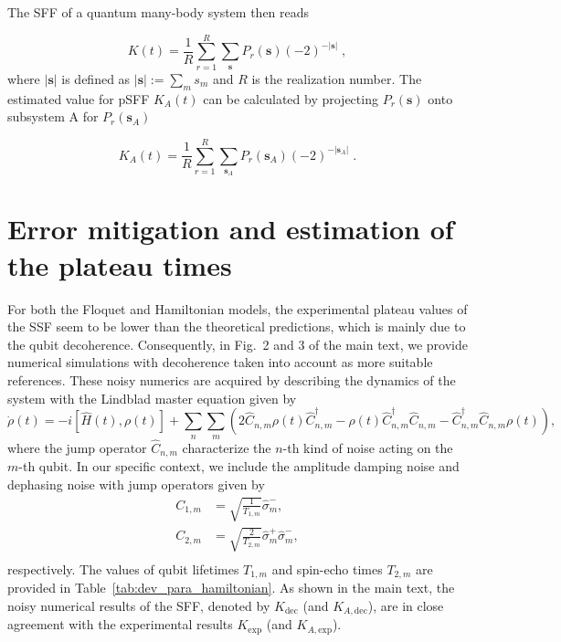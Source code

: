 \documentclass[aps,prx,reprint,twocolumn,superscriptaddress,floatfix,nofootinbib]{revtex4-2}
\begin{document}
The SFF of a quantum many-body system then reads~\cite{ZollerSFF2021}

\begin{equation}

K\left(t\right)
= \frac{1}{R}
\sum_{r=1}^R
\sum_{\mathbf{s}}
P_{r}\left(\mathbf{s}\right)\left(-2\right)^{- |\mathbf{s}|} \; ,
\end{equation}
where $\left|\mathbf{s}\right|$ is defined as $\left|\mathbf{s}\right| := \sum_{m} s_{m}$ and $R$ is the realization number.
The estimated value for pSFF $K_A(t)$ can be calculated by projecting $P_{r}\left(\mathbf{s}\right)$ onto subsystem A for $P_{r}\left(\mathbf{s}_A\right)$

\begin{equation}

K_A\left(t\right)
= \frac{1}{R}
\sum_{r=1}^R
\sum_{\mathbf{s}_A}
P_{r}\left(\mathbf{s}_A\right)\left(-2\right)^{- |\mathbf{s}_A|} \; .
\end{equation}

\section{Error mitigation and estimation of the plateau times}

For both the Floquet and Hamiltonian models, the experimental plateau values of the SSF seem to be lower than the theoretical predictions, which is mainly due to the qubit decoherence. Consequently, in Fig.~2 and 3 of the main text, we provide numerical simulations with decoherence taken into account as more suitable references. These noisy numerics are acquired by describing the dynamics of the system with the Lindblad master equation given by
\begin{equation}
    \dot{\rho}\left(t\right) = -i \left[\hat{H}\left(t\right), \rho\left(t\right)\right]
    + \sum_{n} \sum_{m} \left(2 \hat{C}_{n, m}^{} \rho\left(t\right) \hat{C}_{n, m}^{\dagger} - \rho\left(t\right) \hat{C}_{n, m}^{\dagger} \hat{C}_{n, m}^{} - \hat{C}_{n, m}^{\dagger} \hat{C}_{n, m}^{} \rho\left(t\right)\right),
\end{equation}
where the jump operator $ \hat{C}_{n, m}^{}$ characterize the $n$-th kind of noise acting on the $m$-th qubit.
In our specific context, we include the amplitude damping noise and dephasing noise with jump operators given by
\begin{equation}
    \begin{split}
        C_{1, m} &= \sqrt{\frac{1}{T_{1, m}}} \hat{\sigma}_m^-, \\
        C_{2, m} &= \sqrt{\frac{2}{T_{2, m}}} \hat{\sigma}_m^+ \hat{\sigma}_m^-, \\
    \end{split}
\end{equation}
respectively. The values of qubit lifetimes $T_{1, m}$ and spin-echo times $T_{2, m}$ are provided in Table~\ref{tab:dev_para_hamiltonian}.
As shown in the main text, the noisy numerical results of the SFF, denoted by $K_{\mathrm{dec}}$ (and $K_{A, \mathrm{dec}}$), are in close agreement with the experimental results $K_{\mathrm{exp}}$ (and $K_{A, \mathrm{exp}}$).
\end{document}
